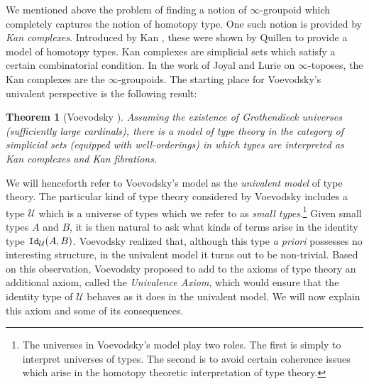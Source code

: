 \documentclass{amsart}
\newcommand{\UU}{\mathcal{U}}
\newcommand{\id}[1]{\textnormal{\texttt{Id}}_{#1}}
\newtheorem{theorem}{Theorem}[section]
\theoremstyle{definition}
\theoremstyle{remark}
\numberwithin{equation}{section}
\begin{document}
We mentioned above the problem of finding a notion of
$\infty$-groupoid which completely captures the notion of homotopy
type.  One such notion is provided by \emph{Kan complexes}.
Introduced by Kan \cite{Kan:1957up}, these were shown by Quillen
\cite{Quillen:1967uz} to provide a model of homotopy types.  Kan
complexes are simplicial sets which satisfy a certain combinatorial
condition.  In the work of Joyal \cite{Joyal:2008uc} and Lurie
\cite{Lurie:2009un} on $\infty$-toposes, the Kan complexes are the
$\infty$-groupoids.  The starting place for Voevodsky's univalent
perspective is the following result:
\begin{theorem}[Voevodsky \cite{Voevodsky:2009}]
  Assuming the existence of Grothendieck universes (sufficiently large
  cardinals), there is a model of type theory in the category of
  simplicial sets (equipped with well-orderings) in which types are interpreted as Kan complexes and
  Kan fibrations.
\end{theorem}
We will henceforth refer to Voevodsky's model as the \emph{univalent
  model} of type theory.  The particular kind of type theory
considered by Voevodsky includes a
type $\UU$ which is a universe of types which we refer to  as
\emph{small types}.\footnote{The universes
  in Voevodsky's model play two roles.  The first is simply to
  interpret universes of types.  The second is to avoid certain
  coherence issues which arise in the homotopy theoretic
  interpretation of type theory.}  Given small types $A$ and $B$, it
is then natural to ask what kinds of terms arise in the identity type
$\id{\UU}(A,B)$.  Voevodsky realized
that, although this type \emph{a priori} possesses no interesting
structure, in the univalent model it turns out to be non-trivial.
Based on this observation, Voevodsky proposed to add to the axioms of
type theory an additional axiom, called the \emph{Univalence Axiom},
which would ensure that the identity type of $\UU$ behaves as it does
in the univalent model.  We will now explain this axiom and some of
its consequences.
\end{document}
